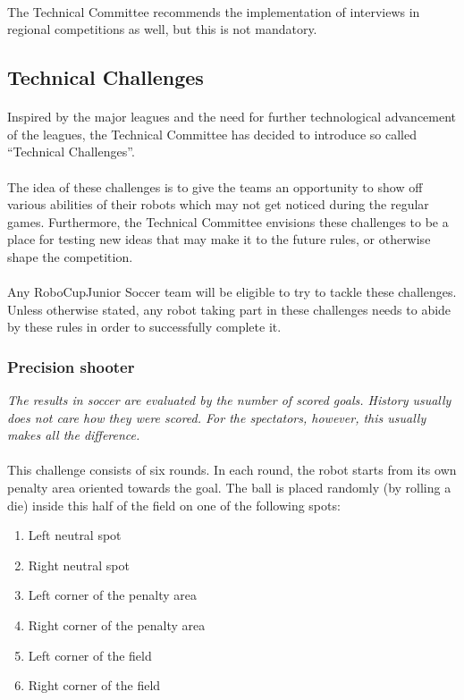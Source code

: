 \documentclass{article}
\newcommand*{\p}{\paragraph{}}
\begin{document}
\p The Technical Committee recommends the implementation of interviews in regional
competitions as well, but this is not mandatory.

\subsection{Technical Challenges}

\p Inspired by the major leagues and the need for further technological
advancement of the leagues, the Technical Committee has decided to introduce so
called ``Technical Challenges''.

\p The idea of these challenges is to give the teams an opportunity to show off
various abilities of their robots which may not get noticed during the regular
games. Furthermore, the Technical Committee envisions these challenges to be a
place for testing new ideas that may make it to the future rules, or otherwise
shape the competition.

\p Any RoboCupJunior Soccer team will be eligible to try to tackle these
challenges. Unless otherwise stated, any robot taking part in these
challenges needs to abide by these rules in order to successfully complete it.

\subsubsection{Precision shooter}

\textit{The results in soccer are evaluated by the number of
scored goals. History usually does not care how they were scored. For
the spectators, however, this usually makes all the difference.}

\p This challenge consists of six rounds. In each round, the robot
starts from its own penalty area oriented towards the goal. The ball is
placed randomly (by rolling a die) inside this half of the field on one of
the following spots:

\begin{enumerate}
    \item Left neutral spot
    \item Right neutral spot
    \item Left corner of the penalty area
    \item Right corner of the penalty area
    \item Left corner of the field
    \item Right corner of the field
\end{enumerate}
\end{document}
